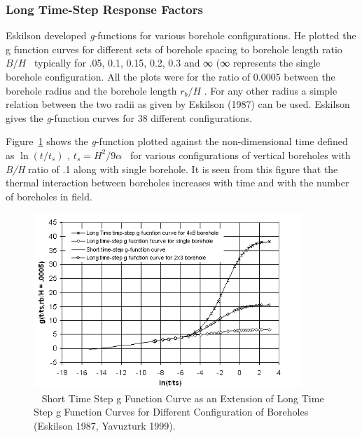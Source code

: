 \subsubsection{Long Time-Step Response Factors}\label{long-time-step-response-factors}

Eskilson developed \emph{g}-functions for various borehole configurations. He plotted the g function curves for different sets of borehole spacing to borehole length ratio \(B/H\) ~typically for .05, 0.1, 0.15, 0.2, 0.3 and ∞ (∞ represents the single borehole configuration. All the plots were for the ratio of 0.0005 between the borehole radius and the borehole length \({r_b}/H\) . For any other radius a simple relation between the two radii as given by Eskilson (1987) can be used. Eskilson gives the \emph{g}-function curves for 38 different configurations.

Figure~\ref{fig:short-time-step-g-function-curve-as-an} shows the \emph{g}-function plotted against the non-dimensional time defined as \(\ln (t/{t_s})\) , \({t_s} = {H^2}/9\alpha\) ~for various configurations of vertical boreholes with \emph{B/H} ratio of .1 along with single borehole. It is seen from this figure that the thermal interaction between boreholes increases with time and with the number of boreholes in field.

\begin{figure}[hbtp] %
\centering
\includegraphics[width=0.9\textwidth, height=0.9\textheight, keepaspectratio=true]{media/image5651.png}
\caption{  Short Time Step g Function Curve as an Extension of Long Time Step g Function Curves for Different Configuration of Boreholes (Eskilson 1987, Yavuzturk 1999). \protect \label{fig:short-time-step-g-function-curve-as-an}}
\end{figure}


